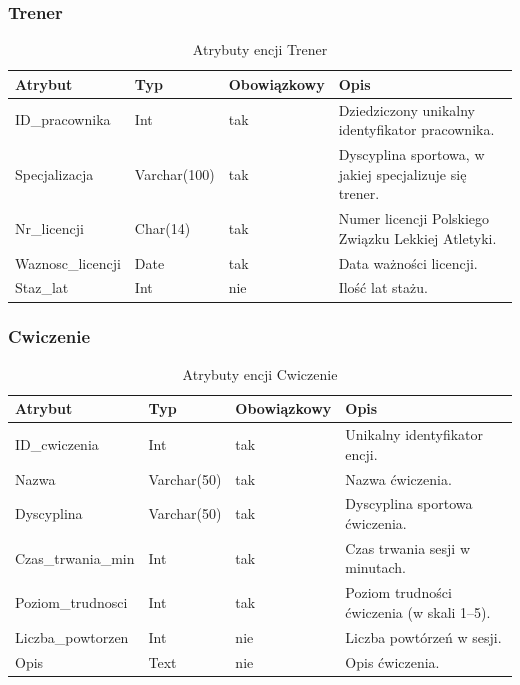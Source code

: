 \documentclass[11pt,a4paper]{article}
\begin{document}
\subsubsection{Trener}
\begin{table}[H]
\centering
\small
\begin{tabularx}{\textwidth}{|L{3cm}|L{2.25cm}|C{2.67cm}|X|}
\hline
\textbf{Atrybut} & \textbf{Typ} & \textbf{Obowiązkowy} & \textbf{Opis} \\
\hline
ID\_pracownika & Int & tak & Dziedziczony unikalny identyfikator pracownika. \\
\hline
Specjalizacja & Varchar(100) & tak & Dyscyplina sportowa, w jakiej specjalizuje się trener. \\
\hline
Nr\_licencji & Char(14) & tak & Numer licencji Polskiego Związku Lekkiej Atletyki. \\
\hline
Waznosc\_licencji & Date & tak & Data ważności licencji. \\
\hline
Staz\_lat & Int & nie & Ilość lat stażu. \\
\hline
\end{tabularx}
\caption{Atrybuty encji Trener}
\label{tab:atrybuty-encja-trener}
\end{table}

\subsubsection{Cwiczenie}
\begin{table}[H]
\centering
\small
\begin{tabularx}{\textwidth}{|L{3cm}|L{2.25cm}|C{2.67cm}|X|}
\hline
\textbf{Atrybut} & \textbf{Typ} & \textbf{Obowiązkowy} & \textbf{Opis} \\
\hline
ID\_cwiczenia & Int & tak & Unikalny identyfikator encji. \\
\hline
Nazwa & Varchar(50) & tak & Nazwa ćwiczenia. \\
\hline
Dyscyplina & Varchar(50) & tak & Dyscyplina sportowa ćwiczenia. \\
\hline
Czas\_trwania\_min & Int & tak & Czas trwania sesji w minutach. \\
\hline
Poziom\_trudnosci & Int & tak & Poziom trudności ćwiczenia (w skali 1--5). \\
\hline
Liczba\_powtorzen & Int & nie & Liczba powtórzeń w sesji. \\
\hline
Opis & Text & nie & Opis ćwiczenia. \\
\hline
\end{tabularx}
\caption{Atrybuty encji Cwiczenie}
\label{tab:atrybuty-encja-cwiczenie}
\end{table}
\end{document}
